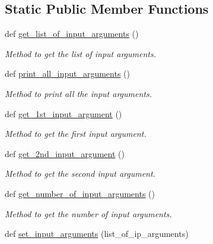 \subsection*{Static Public Member Functions}
\begin{DoxyCompactItemize}
\item 
def \hyperlink{classutilities_1_1queue__ip__arguments_1_1queue__ip__args_a1ace4b3c7b9a9e97a872c3a04337442c}{get\+\_\+list\+\_\+of\+\_\+input\+\_\+arguments} ()
\begin{DoxyCompactList}\small\item\em Method to get the list of input arguments. \end{DoxyCompactList}\item 
def \hyperlink{classutilities_1_1queue__ip__arguments_1_1queue__ip__args_a85480b443e2538123e8531852f9035c9}{print\+\_\+all\+\_\+input\+\_\+arguments} ()
\begin{DoxyCompactList}\small\item\em Method to print all the input arguments. \end{DoxyCompactList}\item 
def \hyperlink{classutilities_1_1queue__ip__arguments_1_1queue__ip__args_a7b3c5efad539fadfb53eda0cfb8d3f03}{get\+\_\+1st\+\_\+input\+\_\+argument} ()
\begin{DoxyCompactList}\small\item\em Method to get the first input argument. \end{DoxyCompactList}\item 
def \hyperlink{classutilities_1_1queue__ip__arguments_1_1queue__ip__args_a18e59da1e2c8044e79ca32a5455ef40b}{get\+\_\+2nd\+\_\+input\+\_\+argument} ()
\begin{DoxyCompactList}\small\item\em Method to get the second input argument. \end{DoxyCompactList}\item 
def \hyperlink{classutilities_1_1queue__ip__arguments_1_1queue__ip__args_ab95a4242fd55bf5d126b35a5f5172593}{get\+\_\+number\+\_\+of\+\_\+input\+\_\+arguments} ()
\begin{DoxyCompactList}\small\item\em Method to get the number of input arguments. \end{DoxyCompactList}\item 
def \hyperlink{classutilities_1_1queue__ip__arguments_1_1queue__ip__args_a4b34415e7ff12abecd89b1e10755aa8d}{set\+\_\+input\+\_\+arguments} (list\+\_\+of\+\_\+ip\+\_\+arguments)

\end{DoxyCompactItemize}
